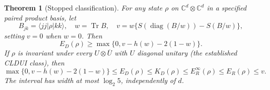 \documentclass[11pt]{article}
\newtheorem{theorem}{Theorem}
\newcommand{\Tr}{\operatorname{Tr}}
\begin{document}
\begin{theorem}[Stopped classification]\label{thm:classification}
For any state $\rho$ on $\mathbb C^d\otimes\mathbb C^d$ in a specified
paired product basis, let
\[
 B_{jk}=\langle jj|\rho|kk\rangle,\quad w=\Tr B,\quad
 v=w\{S(\operatorname{diag}(B/w))-S(B/w)\},
\]
setting $v=0$ when $w=0$. Then
\begin{equation}\label{eq:classlower}
 E_D(\rho)\ge\max\{0,v-h(w)-2(1-w)\}.
\end{equation}
If $\rho$ is invariant under every $U\otimes\overline U$ with $U$
diagonal unitary (the established CLDUI class), then
\begin{equation}\label{eq:cldui}
 \max\{0,v-h(w)-2(1-w)\}
 \le E_D(\rho)\le K_D(\rho)\le E_R^\infty(\rho)\le E_R(\rho)\le v.
\end{equation}
The interval has width at most $\log_2 5$, independently of $d$.
\end{theorem}
\end{document}
